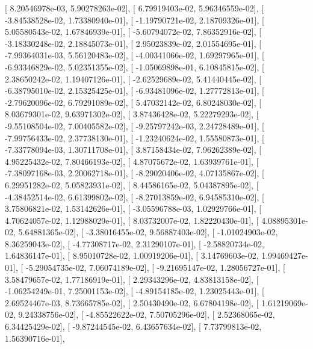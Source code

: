 \documentclass{article}
\begin{document}
       [  8.20546978e-03,   5.90278263e-02],
       [  6.79919403e-02,   5.96346559e-02],
       [ -3.84538528e-02,   1.73380940e-01],
       [ -1.19790721e-02,   2.18709326e-01],
       [  5.05580543e-02,   1.67846939e-01],
       [ -5.60794072e-02,   7.86352916e-02],
       [ -3.18330248e-02,   2.18845073e-01],
       [  2.95023839e-02,   2.01554695e-01],
       [ -7.99364031e-03,   5.56120483e-02],
       [ -4.00341066e-02,   1.69297965e-01],
       [ -6.93346829e-02,   5.02351355e-02],
       [ -1.05069898e-01,   6.10845815e-02],
       [  2.38650242e-02,   1.19407126e-01],
       [ -2.62529689e-02,   5.41440445e-02],
       [ -6.38795010e-02,   2.15325425e-01],
       [ -6.93481096e-02,   1.27772813e-01],
       [ -2.79620096e-02,   6.79291089e-02],
       [  5.47032142e-02,   6.80248030e-02],
       [  8.03679301e-02,   9.63971302e-02],
       [  3.87436428e-02,   5.22279293e-02],
       [ -9.55108504e-02,   7.00405582e-02],
       [ -9.25797242e-03,   2.24728489e-01],
       [ -7.99756433e-02,   2.37738130e-01],
       [ -1.23240624e-02,   1.55580873e-01],
       [ -7.33778094e-03,   1.30711708e-01],
       [  3.87158434e-02,   7.96262389e-02],
       [  4.95225432e-02,   7.80466193e-02],
       [  4.87075672e-02,   1.63939761e-01],
       [ -7.38097168e-03,   2.20062718e-01],
       [ -8.29020406e-02,   4.07135867e-02],
       [  6.29951282e-02,   5.05823931e-02],
       [  8.44586165e-02,   5.04387895e-02],
       [ -4.38452514e-02,   6.61399802e-02],
       [ -8.27013859e-02,   6.94585310e-02],
       [  3.75806821e-02,   1.53142626e-01],
       [ -3.05596788e-03,   1.02929766e-01],
       [  4.70624057e-02,   1.12988029e-01],
       [  8.03732007e-02,   1.82220430e-01],
       [  4.08895301e-02,   5.64881365e-02],
       [ -3.38016455e-02,   9.56887403e-02],
       [ -1.01024903e-02,   8.36259043e-02],
       [ -4.77308717e-02,   2.31290107e-01],
       [ -2.58820734e-02,   1.64836147e-01],
       [  8.95010728e-02,   1.00919206e-01],
       [  3.14769603e-02,   1.99469427e-01],
       [ -5.29054735e-02,   7.06074189e-02],
       [ -9.21695147e-02,   1.28056727e-01],
       [  3.58479657e-02,   1.77186919e-01],
       [  2.29343296e-02,   4.83813158e-02],
       [ -1.06254249e-01,   7.25001153e-02],
       [ -4.89154185e-02,   1.23025443e-01],
       [  2.69524467e-03,   8.73665785e-02],
       [  2.50430490e-02,   6.67804198e-02],
       [  1.61219069e-02,   9.24338756e-02],
       [ -4.85522622e-02,   7.50705296e-02],
       [  2.52368065e-02,   6.34425429e-02],
       [ -9.87244545e-02,   6.43657634e-02],
       [  7.73799813e-02,   1.56390716e-01],
\end{document}
